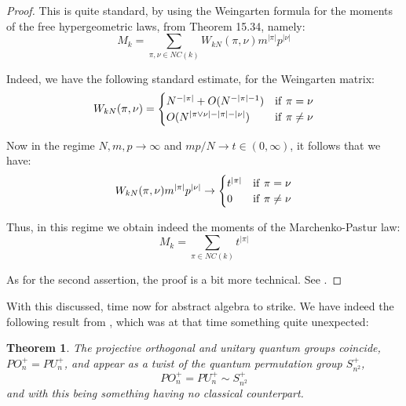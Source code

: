\documentclass[12pt]{amsbook}
\newtheorem{theorem}{Theorem}[chapter]
\begin{document}
\begin{proof}
This is quite standard, by using the Weingarten formula for the moments of the free hypergeometric laws, from Theorem 15.34, namely:
$$M_k=\sum_{\pi,\nu\in NC(k)}W_{kN}(\pi,\nu)m^{|\pi|}p^{|\nu|}$$

Indeed, we have the following standard estimate, for the Weingarten matrix:
$$W_{kN}(\pi,\nu)= 
\begin{cases}N^{-|\pi|}+O(N^{-|\pi|-1})&{\rm if}\ \pi=\nu\\ 
O(N^{|\pi\vee\nu|-|\pi|-|\nu|})&{\rm if}\ \pi\neq\nu
\end{cases}$$

Now in the regime $N,m,p\to\infty$ and $mp/N\to t\in(0,\infty)$, it follows that we have:
$$W_{kN}(\pi,\nu)m^{|\pi|}p^{|\nu|} \to 
\begin{cases}
t^{|\pi|}&{\rm if}\ \pi=\nu\\ 
0&{\rm if}\ \pi\neq\nu 
\end{cases}$$

Thus, in this regime we obtain indeed the moments of the Marchenko-Pastur law:
$$M_k=\sum_{\pi\in NC(k)}t^{|\pi|}$$

As for the second assertion, the proof is a bit more technical. See \cite{bbc}.
\end{proof}

With this discussed, time now for abstract algebra to strike. We have indeed the following result from \cite{bbc}, which was at that time something quite unexpected:

\begin{theorem}
The projective orthogonal and unitary quantum groups coincide, $PO_n^+=PU_n^+$, and appear as a twist of the quantum permutation group $S_{n^2}^+$,
$$PO_n^+=PU_n^+\sim S_{n^2}^+$$
and with this being something having no classical counterpart.
\end{theorem}
 
\end{document}
